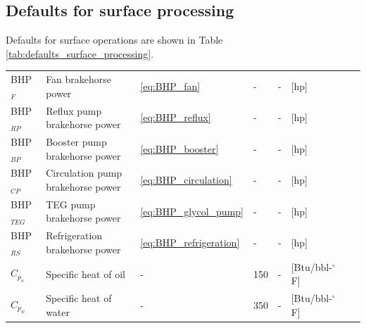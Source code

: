 \documentclass[11pt]{report}
\begin{document}
\clearpage

\subsection{Defaults for surface processing}

Defaults for surface operations are shown in Table \ref{tab:defaults_surface_processing}.


\begin{landscape}
\begin{scriptsize}
\tablelasttail{\bottomrule}
\label{tab:defaults_surface_processing}
\begin{supertabular*}{1\columnwidth}
{p{0.08\columnwidth}p{0.26\columnwidth}p{0.05\columnwidth}p{0.1\columnwidth}p{0.06\columnwidth}p{0.15\columnwidth}p{0.11\columnwidth}p{0.05\columnwidth}}
BHP$_{F}$ & Fan brakehorse power & \eqref{eq:BHP_fan} & - & - & [hp] & \cite[p. 118]{Manning1991} & \\ 
BHP$_{RP}$ & Reflux pump brakehorse power & \eqref{eq:BHP_reflux} & - & - & [hp] & \cite[p. 118]{Manning1991} & \\ 
BHP$_{BP}$ & Booster pump brakehorse power & \eqref{eq:BHP_booster} & - & - & [hp] & \cite[p. 118]{Manning1991} & \\ 
BHP$_{CP}$ & Circulation pump brakehorse power & \eqref{eq:BHP_circulation} & - & - & [hp] & \cite[p. 118]{Manning1991} & \\ 
BHP$_{TEG}$ & TEG pump brakehorse power & \eqref{eq:BHP_glycol_pump} & - & - & [hp] & \cite[p. 455]{Mcallister2009} & \\
BHP$_{RS}$ & Refrigeration brakehorse power & \eqref{eq:BHP_refrigeration} & - & - & [hp] & \cite{Nawaz2010} & \\
$C_{p_{o}}$ & Specific heat of oil & - & 150 & - & [Btu/bbl-$^{\circ}${F}] & \cite[p. 136]{Manning1995} & \\ 
$C_{p_{w}}$ & Specific heat of water & - & 350 & - & [Btu/bbl-$^{\circ}${F}] & \cite[p. 136]{Manning1995} & \\ 

\end{supertabular*}
\end{scriptsize}
\end{landscape}
\end{document}
